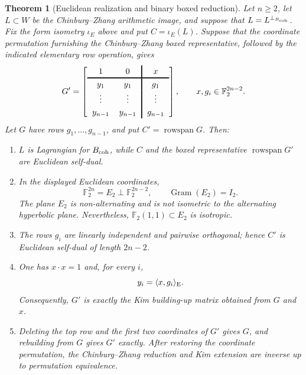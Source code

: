 \documentclass[12pt]{article}
\newtheorem{theorem}{Theorem}[section]
\newenvironment{blueblock}{\begingroup\color{blue}}{\endgroup}
\begin{document}
\begin{theorem}[Euclidean realization and binary boxed reduction]
\label{thm:binary-cz-kim}
Let \(n\ge2\), let \(L\subset W\) be the Chinburg--Zhang arithmetic image,
and suppose that \(L=L^{\perp_{B_{\rm coh}}}\). Fix the form isometry
\(\iota_E\) above and put \(C=\iota_E(L)\). Suppose that the coordinate
permutation furnishing the Chinburg--Zhang boxed representative, followed by
the indicated elementary row operation, gives
\[
G'=
\begingroup
\setlength{\arraycolsep}{6pt}
\renewcommand{\arraystretch}{1.2}
\left[
\begin{array}{cc!{\vrule width 1.2pt}c}
1&0&x\\
\noalign{\hrule height 1.2pt}
y_1&y_1&g_1\\
\vdots&\vdots&\vdots\\
y_{n-1}&y_{n-1}&g_{n-1}
\end{array}
\right],
\endgroup
\qquad x,g_i\in\mathbb F_2^{2n-2}.
\]
Let \(G\) have rows \(g_1,\ldots,g_{n-1}\), and put
\(C'=\operatorname{rowspan}G\). Then:
\begin{enumerate}
\item \(L\) is Lagrangian for \(B_{\rm coh}\), while \(C\) and the boxed
representative \(\operatorname{rowspan}G'\) are Euclidean self-dual.
\item In the displayed Euclidean coordinates,
\[
\mathbb F_2^{2n}=E_2\perp\mathbb F_2^{2n-2},
\qquad \operatorname{Gram}(E_2)=I_2.
\]
The plane \(E_2\) is non-alternating and is not isometric to the
alternating hyperbolic plane. Nevertheless,
\(\mathbb F_2(1,1)\subset E_2\) is isotropic.
\item The rows \(g_i\) are linearly independent and pairwise orthogonal;
hence \(C'\) is Euclidean self-dual of length \(2n-2\).
\item One has \(x\cdot x=1\) and, for every \(i\),
\[
y_i=\langle x,g_i\rangle_{\rm E}.
\]
Consequently, \(G'\) is exactly the Kim building-up matrix obtained from
\(G\) and \(x\).
\item Deleting the top row and the first two coordinates of \(G'\) gives
\(G\), and rebuilding from \(G\) gives \(G'\) exactly. After restoring the
coordinate permutation, the Chinburg--Zhang reduction and Kim extension are
inverse up to permutation equivalence.
\end{enumerate}
\end{theorem}
\end{document}
